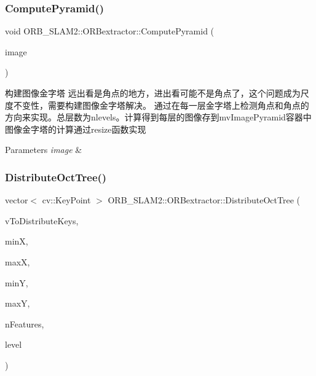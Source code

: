 \mbox{\label{class_o_r_b___s_l_a_m2_1_1_o_r_bextractor_a058f24d80bb0b2c7d6fc0bdd3d9144d1}} 
\subsubsection{\texorpdfstring{Compute\+Pyramid()}{ComputePyramid()}}
{\footnotesize\ttfamily void O\+R\+B\+\_\+\+S\+L\+A\+M2\+::\+O\+R\+Bextractor\+::\+Compute\+Pyramid (\begin{DoxyParamCaption}\item[{cv\+::\+Mat}]{image }\end{DoxyParamCaption})\hspace{0.3cm}{\ttfamily [protected]}}



构建图像金字塔 远出看是角点的地方，进出看可能不是角点了，这个问题成为尺度不变性，需要构建图像金字塔解决。 通过在每一层金字塔上检测角点和角点的方向来实现。总层数为nlevels。计算得到每层的图像存到mv\+Image\+Pyramid容器中 图像金字塔的计算通过resize函数实现 


\begin{DoxyParams}{Parameters}
{\em image} & \\
\hline
\end{DoxyParams}
\mbox{\label{class_o_r_b___s_l_a_m2_1_1_o_r_bextractor_ac6b7b27447324af33fa60d6dc0c8ffa0}} 
\subsubsection{\texorpdfstring{Distribute\+Oct\+Tree()}{DistributeOctTree()}}
{\footnotesize\ttfamily vector$<$ cv\+::\+Key\+Point $>$ O\+R\+B\+\_\+\+S\+L\+A\+M2\+::\+O\+R\+Bextractor\+::\+Distribute\+Oct\+Tree (\begin{DoxyParamCaption}\item[{const std\+::vector$<$ cv\+::\+Key\+Point $>$ \&}]{v\+To\+Distribute\+Keys,  }\item[{const int \&}]{minX,  }\item[{const int \&}]{maxX,  }\item[{const int \&}]{minY,  }\item[{const int \&}]{maxY,  }\item[{const int \&}]{n\+Features,  }\item[{const int \&}]{level }\end{DoxyParamCaption})\hspace{0.3cm}{\ttfamily [protected]}}



